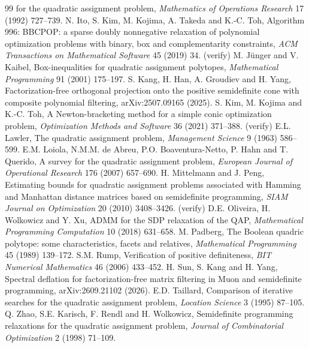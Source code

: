 \documentclass[11pt]{article}
\theoremstyle{remark}
\begin{document}
{\begin{thebibliography}{99}
  for the quadratic assignment problem, \emph{Mathematics of Operations Research} 17
  (1992) 727--739.
 N. Ito, S. Kim, M. Kojima, A. Takeda and K.-C. Toh, Algorithm 996:
  BBCPOP: a sparse doubly nonnegative relaxation of polynomial optimization
  problems with binary, box and complementarity constraints, \emph{ACM
  Transactions on Mathematical Software} 45 (2019) 34. (verify)
 M. J\"unger and V. Kaibel, Box-inequalities for quadratic assignment
  polytopes, \emph{Mathematical Programming} 91 (2001) 175--197.
 S. Kang, H. Han, A. Groudiev and H. Yang, Factorization-free orthogonal
  projection onto the positive semidefinite cone with composite polynomial
  filtering, arXiv:2507.09165 (2025).
 S. Kim, M. Kojima and K.-C. Toh, A Newton-bracketing method for a
  simple conic optimization problem, \emph{Optimization Methods and Software} 36
  (2021) 371--388. (verify)
 E.L. Lawler, The quadratic assignment problem, \emph{Management
  Science} 9 (1963) 586--599.
 E.M. Loiola, N.M.M. de Abreu, P.O. Boaventura-Netto, P. Hahn and
  T. Querido, A survey for the quadratic assignment problem, \emph{European Journal
  of Operational Research} 176 (2007) 657--690.
 H. Mittelmann and J. Peng, Estimating bounds for quadratic assignment
  problems associated with Hamming and Manhattan distance matrices based on
  semidefinite programming, \emph{SIAM Journal on Optimization} 20 (2010)
  3408--3426. (verify)
 D.E. Oliveira, H. Wolkowicz and Y. Xu, ADMM for the SDP relaxation of
  the QAP, \emph{Mathematical Programming Computation} 10 (2018) 631--658.
 M. Padberg, The Boolean quadric polytope: some characteristics,
  facets and relatives, \emph{Mathematical Programming} 45 (1989) 139--172.
 S.M. Rump, Verification of positive definiteness, \emph{BIT
  Numerical Mathematics} 46 (2006) 433--452.
 H. Sun, S. Kang and H. Yang, Spectral deflation for factorization-free
  matrix filtering in Muon and semidefinite programming, arXiv:2609.21102 (2026).
 E.D. Taillard, Comparison of iterative searches for the
  quadratic assignment problem, \emph{Location Science} 3 (1995) 87--105.
 Q. Zhao, S.E. Karisch, F. Rendl and H. Wolkowicz, Semidefinite
  programming relaxations for the quadratic assignment problem, \emph{Journal of
  Combinatorial Optimization} 2 (1998) 71--109.
\end{thebibliography}}
\end{document}
